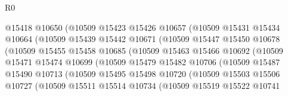 \begin{lexlean}{R0}
\begin{coremodule}
                            @15418
                            @10650
                            (@10509
                              @15423
                              @15426
                              @10657
                              (@10509
                                @15431
                                @15434
                                @10664
                                (@10509
                                  @15439
                                  @15442
                                  @10671
                                  (@10509
                                    @15447
                                    @15450
                                    @10678
                                    (@10509
                                      @15455
                                      @15458
                                      @10685
                                      (@10509
                                        @15463
                                        @15466
                                        @10692
                                        (@10509
                                          @15471
                                          @15474
                                          @10699
                                          (@10509
                                            @15479
                                            @15482
                                            @10706
                                            (@10509
                                              @15487
                                              @15490
                                              @10713
                                              (@10509
                                                @15495
                                                @15498
                                                @10720
                                                (@10509
                                                  @15503
                                                  @15506
                                                  @10727
                                                  (@10509
                                                    @15511
                                                    @15514
                                                    @10734
                                                    (@10509
                                                      @15519
                                                      @15522
                                                      @10741

\end{coremodule}
\end{lexlean}
